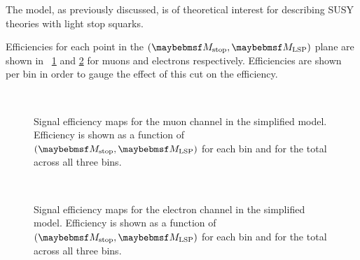 \subsubsection{\Ttwott}
The \Ttwott model, as previously discussed, is of theoretical interest for
describing \ac{SUSY} theories with light stop squarks.

Efficiencies for each point in the $(\Mstop, \Mlsp)$ plane are shown in
\figs~\ref{fig:inter_t2tt_mu} and \ref{fig:inter_t2tt_el} for muons and
electrons respectively. Efficiencies are shown per \STlep bin in order to gauge
the effect of this cut on the efficiency.

\begin{figure}
\centering
{}\quad
{}\\
\quad
{}
\caption[Signal efficiencies for the muon channel in the \Ttwott simplified
  model]{Signal efficiency maps for the muon channel in the \Ttwott simplified
  model. Efficiency is shown as a function of $(\Mstop, \Mlsp)$ for each \STlep
  bin and for the total across all three bins.}
\label{fig:inter_t2tt_mu}
\end{figure}

\begin{figure}
\centering
{}\quad
{}\\
\quad
{}
\caption[Signal efficiencies for the electron channel in the \Ttwott simplified
  model]{Signal efficiency maps for the electron channel in the \Ttwott simplified
  model. Efficiency is shown as a function of $(\Mstop, \Mlsp)$ for each \STlep
  bin and for the total across all three bins.}
\label{fig:inter_t2tt_el}
\end{figure}

